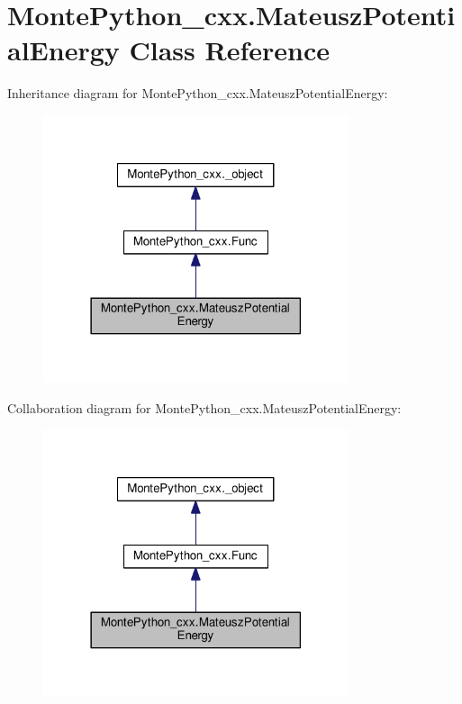 \hypertarget{classMontePython__cxx_1_1MateuszPotentialEnergy}{}\section{Monte\+Python\+\_\+cxx.\+Mateusz\+Potential\+Energy Class Reference}
\label{classMontePython__cxx_1_1MateuszPotentialEnergy}


Inheritance diagram for Monte\+Python\+\_\+cxx.\+Mateusz\+Potential\+Energy\+:
\nopagebreak
\begin{figure}[H]
\begin{center}
\leavevmode
\includegraphics[width=254pt]{classMontePython__cxx_1_1MateuszPotentialEnergy__inherit__graph}
\end{center}
\end{figure}


Collaboration diagram for Monte\+Python\+\_\+cxx.\+Mateusz\+Potential\+Energy\+:
\nopagebreak
\begin{figure}[H]
\begin{center}
\leavevmode
\includegraphics[width=254pt]{classMontePython__cxx_1_1MateuszPotentialEnergy__coll__graph}
\end{center}
\end{figure}
